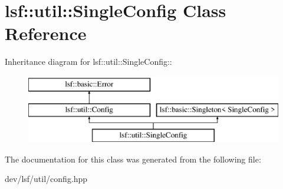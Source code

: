 \hypertarget{classlsf_1_1util_1_1SingleConfig}{
\section{lsf::util::SingleConfig Class Reference}
\label{classlsf_1_1util_1_1SingleConfig}
}
Inheritance diagram for lsf::util::SingleConfig::\begin{figure}[H]
\begin{center}
\leavevmode
\includegraphics[height=3cm]{classlsf_1_1util_1_1SingleConfig}
\end{center}
\end{figure}


The documentation for this class was generated from the following file:\begin{DoxyCompactItemize}
\item 
dev/lsf/util/config.hpp\end{DoxyCompactItemize}
